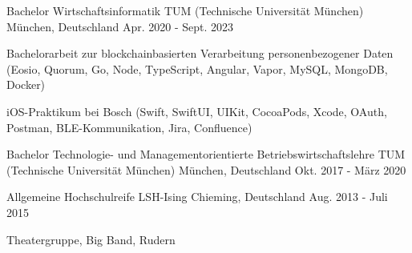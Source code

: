 


\begin{cventries}

\cventry
{Bachelor Wirtschaftsinformatik} %
{TUM (Technische Universität München)} %
{München, Deutschland} %
{Apr. 2020 - Sept. 2023} %
{ %
\begin{cvitems}
\item {Bachelorarbeit zur blockchainbasierten Verarbeitung personenbezogener Daten (Eosio, Quorum, Go, Node, TypeScript, Angular, Vapor, MySQL, MongoDB, Docker)}
\item {iOS-Praktikum bei Bosch (Swift, SwiftUI, UIKit, CocoaPods, Xcode, OAuth, Postman, BLE-Kommunikation, Jira, Confluence)}
\end{cvitems}
}

\cventry
{Bachelor Technologie- und Managementorientierte Betriebswirtschaftslehre} %
{TUM (Technische Universität München)} %
{München, Deutschland} %
{Okt. 2017 - März 2020} %
{ %
\begin{cvitems}
\end{cvitems}
}

\cventry
{Allgemeine Hochschulreife} %
{LSH-Ising} %
{Chieming, Deutschland} %
{Aug. 2013 - Juli 2015} %
{ %
\begin{cvitems}
\item {Theatergruppe, Big Band, Rudern}
\end{cvitems}
}



\end{cventries}
